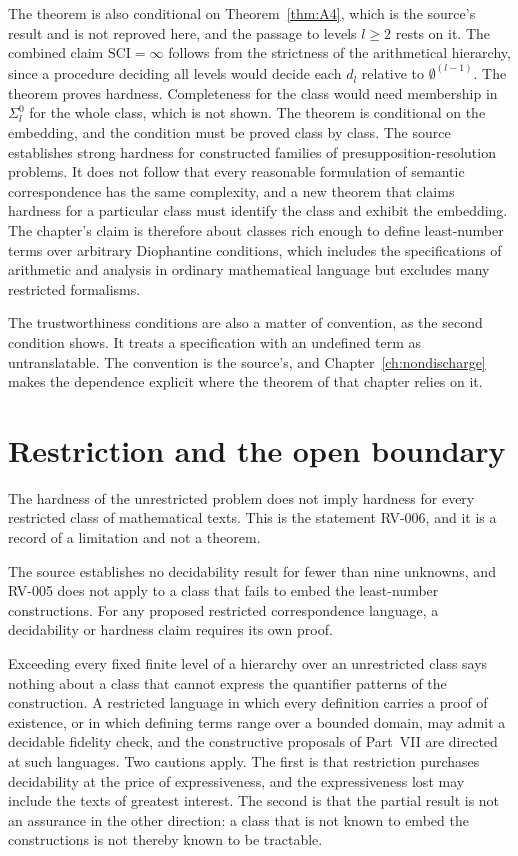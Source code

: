 The theorem is also conditional on Theorem~\ref{thm:A4}, which is the source's result and is not reproved here, and the passage to levels $l \ge 2$ rests on it. The combined claim $\mathrm{SCI}=\infty$ follows from the strictness of the arithmetical hierarchy, since a procedure deciding all levels would decide each $d_l$ relative to $\emptyset^{(l-1)}$. The theorem proves hardness. Completeness for the class would need membership in $\Sigma^0_l$ for the whole class, which is not shown. The theorem is conditional on the embedding, and the condition must be proved class by class. The source establishes strong hardness for constructed families of presupposition-resolution problems. It does not follow that every reasonable formulation of semantic correspondence has the same complexity, and a new theorem that claims hardness for a particular class must identify the class and exhibit the embedding. The chapter's claim is therefore about classes rich enough to define least-number terms over arbitrary Diophantine conditions, which includes the specifications of arithmetic and analysis in ordinary mathematical language but excludes many restricted formalisms.

The trustworthiness conditions are also a matter of convention, as the second condition shows. It treats a specification with an undefined term as untranslatable. The convention is the source's, and Chapter~\ref{ch:nondischarge} makes the dependence explicit where the theorem of that chapter relies on it.

\section{Restriction and the open boundary}

The hardness of the unrestricted problem does not imply hardness for every restricted class of mathematical texts. This is the statement RV-006, and it is a record of a limitation and not a theorem.

\begin{remark}[RV-006]
\label{prop:rv006}
The source establishes no decidability result for fewer than nine unknowns, and RV-005 does not apply to a class that fails to embed the least-number constructions. For any proposed restricted correspondence language, a decidability or hardness claim requires its own proof.
\end{remark}

Exceeding every fixed finite level of a hierarchy over an unrestricted class says nothing about a class that cannot express the quantifier patterns of the construction. A restricted language in which every definition carries a proof of existence, or in which defining terms range over a bounded domain, may admit a decidable fidelity check, and the constructive proposals of Part~VII are directed at such languages. Two cautions apply. The first is that restriction purchases decidability at the price of expressiveness, and the expressiveness lost may include the texts of greatest interest. The second is that the partial result is not an assurance in the other direction: a class that is not known to embed the constructions is not thereby known to be tractable.

